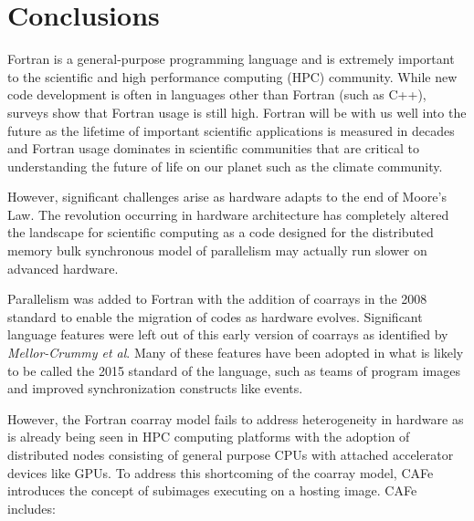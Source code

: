 \section{Conclusions}

Fortran is a general-purpose programming language and is extremely important to the
scientific and high performance computing (HPC) community.  While new code development is
often in languages other than Fortran (such as C++), surveys show that Fortran usage is
still high\cite{prabhu2011survey}.  Fortran will be with us well into the future as the
lifetime of important scientific applications is measured in decades and Fortran usage
dominates in scientific communities that are critical to understanding the future of
life on our planet such as the climate community.

However, significant challenges arise as hardware adapts to the end of Moore's
Law\cite{exascale:workshop:2011}.  The revolution occurring in hardware architecture
has completely altered the landscape for scientific computing as a code designed for the
distributed memory bulk synchronous model of parallelism may actually run slower on
advanced hardware\cite{Dubey:2014:SSC:2686745.2686756}.

Parallelism was added to Fortran with the addition of coarrays in the 2008
standard\cite{fortran:2008} to enable the migration of codes as hardware evolves.
Significant language features were left out of this early version of coarrays as
identified by \emph{Mellor-Crummy et al}\cite{mellor-crummey:2009:caf2}.  Many of these features
have been adopted in what is likely to be called the 2015 standard of the language\cite{fortran:2015},
such as teams of program images and improved synchronization constructs like events.


However, the Fortran coarray model fails to address heterogeneity in hardware as is already
being seen in HPC computing platforms with the adoption of distributed nodes consisting of
general purpose CPUs with attached accelerator devices like GPUs.  To address this shortcoming
of the coarray model, CAFe introduces the concept of subimages executing on a hosting image.  
CAFe includes:

